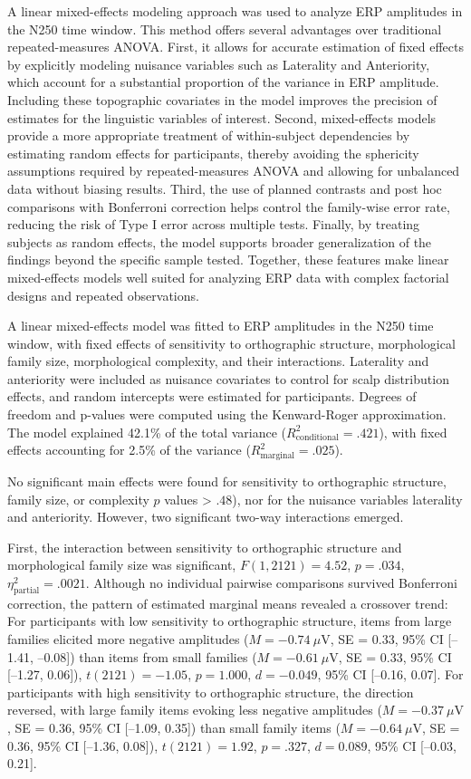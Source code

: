 \documentclass[preprint,12pt, authoryear, review]{elsarticle}
\begin{document}
A linear mixed-effects modeling approach was used to analyze ERP amplitudes in the N250 time window. This method offers several advantages over traditional repeated-measures ANOVA. First, it allows for accurate estimation of fixed effects by explicitly modeling nuisance variables such as Laterality and Anteriority, which account for a substantial proportion of the variance in ERP amplitude. Including these topographic covariates in the model improves the precision of estimates for the linguistic variables of interest. Second, mixed-effects models provide a more appropriate treatment of within-subject dependencies by estimating random effects for participants, thereby avoiding the sphericity assumptions required by repeated-measures ANOVA and allowing for unbalanced data without biasing results. Third, the use of planned contrasts and post hoc comparisons with Bonferroni correction helps control the family-wise error rate, reducing the risk of Type I error across multiple tests. Finally, by treating subjects as random effects, the model supports broader generalization of the findings beyond the specific sample tested. Together, these features make linear mixed-effects models well suited for analyzing ERP data with complex factorial designs and repeated observations.

A linear mixed-effects model was fitted to ERP amplitudes in the N250 time window, with fixed effects of sensitivity to orthographic structure, morphological family size, morphological complexity, and their interactions. Laterality and anteriority were included as nuisance covariates to control for scalp distribution effects, and random intercepts were estimated for participants. Degrees of freedom and p-values were computed using the Kenward-Roger approximation. The model explained 42.1\% of the total variance ($R^2_\text{conditional} = .421$), with fixed effects accounting for 2.5\% of the variance ($R^2_\text{marginal} = .025$).

No significant main effects were found for sensitivity to orthographic structure, family size, or complexity $p$ values > $.48$), nor for the nuisance variables laterality and anteriority. However, two significant two-way interactions emerged.

First, the interaction between sensitivity to orthographic structure and morphological family size was significant, $F(1, 2121) = 4.52$, $p = .034$, $\eta^2_{\text{partial}} = .0021$. Although no individual pairwise comparisons survived Bonferroni correction, the pattern of estimated marginal means revealed a crossover trend: For participants with low sensitivity to orthographic structure, items from large families elicited more negative amplitudes ($M = -0.74~\mu\text{V}$, SE = 0.33, 95\% CI [–1.41, –0.08]) than items from small families ($M = -0.61~\mu\text{V}$, SE = 0.33, 95\% CI [–1.27, 0.06]), $t(2121) = -1.05$, $p = 1.000$, $d = -0.049$, 95\% CI [–0.16, 0.07]. For participants with high sensitivity to orthographic structure, the direction reversed, with large family items evoking less negative amplitudes ($M = -0.37~\mu\text{V}$, SE = 0.36, 95\% CI [–1.09, 0.35]) than small family items ($M = -0.64~\mu\text{V}$, SE = 0.36, 95\% CI [–1.36, 0.08]), $t(2121) = 1.92$, $p = .327$, $d = 0.089$, 95\% CI [–0.03, 0.21].
\end{document}
